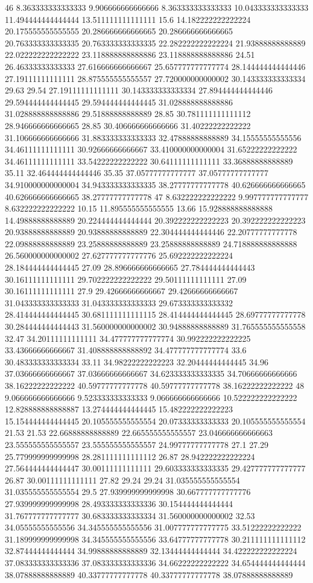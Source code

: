 46 8.363333333333333 9.906666666666666 8.363333333333333 10.043333333333333 11.494444444444444 13.511111111111111 15.6 14.182222222222224 20.175555555555555 20.286666666666665 20.286666666666665 20.763333333333335 20.763333333333335 22.282222222222224 21.93888888888889 22.022222222222222 23.118888888888886 23.118888888888886 24.51 26.46333333333333 27.616666666666667 25.657777777777774 28.144444444444446 27.19111111111111 28.875555555555557 27.720000000000002 30.143333333333334 29.63 29.54 27.19111111111111 30.143333333333334 27.894444444444446 29.594444444444445 29.594444444444445 31.028888888888886 31.028888888888886 29.51888888888889 28.85 30.781111111111112 28.946666666666665 28.85 30.406666666666666 31.40222222222222 31.106666666666666 31.883333333333333 32.47888888888889 34.15555555555556 34.46111111111111 30.92666666666667 33.410000000000004 31.65222222222222 34.46111111111111 33.54222222222222 30.64111111111111 33.36888888888889 35.11 32.464444444444446 35.35 37.05777777777777 37.05777777777777 34.910000000000004 34.943333333333335 38.27777777777778 40.626666666666665 40.626666666666665 38.27777777777778
47 8.632222222222222 9.997777777777777 8.632222222222222 10.15 11.895555555555555 13.66 15.928888888888888 14.49888888888889 20.224444444444444 20.392222222222223 20.392222222222223 20.93888888888889 20.93888888888889 22.304444444444446 22.20777777777778 22.09888888888889 23.25888888888889 23.25888888888889 24.718888888888888 26.560000000000002 27.627777777777776 25.692222222222224 28.184444444444445 27.09 28.896666666666665 27.784444444444443 30.16111111111111 29.702222222222222 29.50111111111111 27.09 30.16111111111111 27.9 29.42666666666667 29.42666666666667 31.043333333333333 31.043333333333333 29.673333333333332 28.414444444444445 30.681111111111115 28.414444444444445 28.69777777777778 30.284444444444443 31.560000000000002 30.94888888888889 31.765555555555558 32.47 34.20111111111111 34.477777777777774 30.992222222222225 33.43666666666667 31.408888888888892 34.477777777777774 33.6 30.483333333333334 33.11 34.98222222222223 32.20444444444445 34.96 37.03666666666667 37.03666666666667 34.623333333333335 34.70666666666666 38.16222222222222 40.59777777777778 40.59777777777778 38.16222222222222
48 9.066666666666666 9.523333333333333 9.066666666666666 10.522222222222222 12.828888888888887 13.274444444444445 15.482222222222223 15.154444444444445 20.105555555555554 20.07333333333333 20.105555555555554 21.53 21.53 22.66888888888889 22.665555555555557 23.046666666666663 23.555555555555557 23.555555555555557 24.99777777777778 27.1 27.29 25.779999999999998 28.281111111111112 26.87 28.942222222222224 27.564444444444447 30.00111111111111 29.603333333333335 29.427777777777777 26.87 30.00111111111111 27.82 29.24 29.24 31.035555555555554 31.035555555555554 29.5 27.939999999999998 30.667777777777776 27.939999999999998 28.493333333333336 30.154444444444444 31.767777777777777 30.683333333333334 31.560000000000002 32.53 34.05555555555556 34.345555555555556 31.007777777777775 33.51222222222222 31.189999999999998 34.345555555555556 33.64777777777778 30.211111111111112 32.87444444444444 34.99888888888889 32.13444444444444 34.422222222222224 37.083333333333336 37.083333333333336 34.66222222222222 34.654444444444444 38.07888888888889 40.33777777777778 40.33777777777778 38.07888888888889
